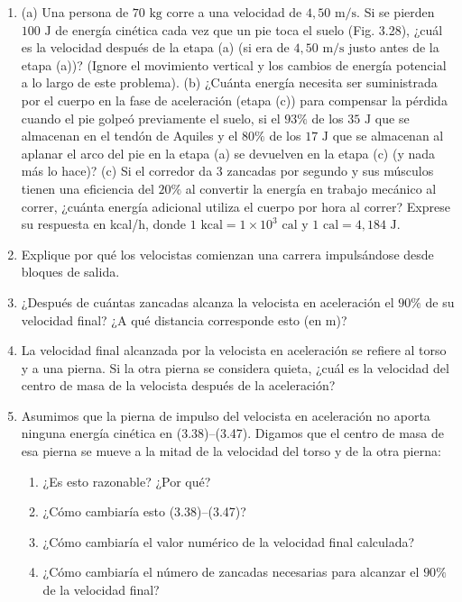 \documentclass[12pt]{book}
\begin{document}
\begin{enumerate}
\item[3.34] (a) Una persona de $70\text{ kg}$ corre a una velocidad de $4{,}50\text{ m/s}$. Si se pierden $100\text{ J}$ de energía cinética cada vez que un pie toca el suelo (Fig. 3.28), ¿cuál es la velocidad después de la etapa (a) (si era de $4{,}50\text{ m/s}$ justo antes de la etapa (a))? (Ignore el movimiento vertical y los cambios de energía potencial a lo largo de este problema).
(b) ¿Cuánta energía necesita ser suministrada por el cuerpo en la fase de aceleración (etapa (c)) para compensar la pérdida cuando el pie golpeó previamente el suelo, si el $93\%$ de los $35\text{ J}$ que se almacenan en el tendón de Aquiles y el $80\%$ de los $17\text{ J}$ que se almacenan al aplanar el arco del pie en la etapa (a) se devuelven en la etapa (c) (y nada más lo hace)?
(c) Si el corredor da 3 zancadas por segundo y sus músculos tienen una eficiencia del $20\%$ al convertir la energía en trabajo mecánico al correr, ¿cuánta energía adicional utiliza el cuerpo por hora al correr? Exprese su respuesta en kcal/h, donde $1\text{ kcal} = 1 \times 10^3\text{ cal}$ y $1\text{ cal} = 4{,}184\text{ J}$.

\item[3.35] Explique por qué los velocistas comienzan una carrera impulsándose desde bloques de salida.

\item[3.36] ¿Después de cuántas zancadas alcanza la velocista en aceleración el $90\%$ de su velocidad final? ¿A qué distancia corresponde esto (en m)?

\item[3.37] La velocidad final alcanzada por la velocista en aceleración se refiere al torso y a una pierna. Si la otra pierna se considera quieta, ¿cuál es la velocidad del centro de masa de la velocista después de la aceleración?

\item[3.38] Asumimos que la pierna de impulso del velocista en aceleración no aporta ninguna energía cinética en (3.38)--(3.47). Digamos que el centro de masa de esa pierna se mueve a la mitad de la velocidad del torso y de la otra pierna:
\begin{enumerate}
\item[(a)] ¿Es esto razonable? ¿Por qué?
\item[(b)] ¿Cómo cambiaría esto (3.38)--(3.47)?
\item[(c)] ¿Cómo cambiaría el valor numérico de la velocidad final calculada?
\item[(d)] ¿Cómo cambiaría el número de zancadas necesarias para alcanzar el $90\%$ de la velocidad final?
\end{enumerate}


\end{enumerate}
\end{document}
